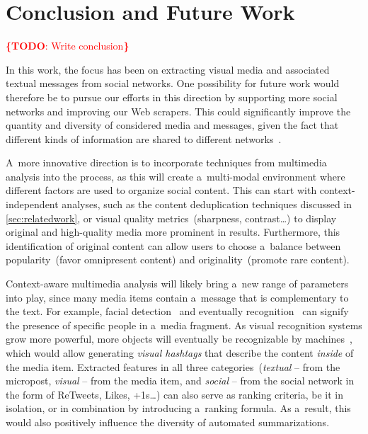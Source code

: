 \documentclass{acm_proc_article-sp}
\let\oldemph\emph
\renewcommand{\emph}[1]{\oldemph{\fontsize{9}{9}\selectfont #1}}
\newcommand{\todo}[1]{\noindent\textcolor{red}{{\bf \{TODO}: #1{\bf \}}}}
\begin{document}

\section{Conclusion and Future Work}
\todo{Write conclusion}

In this work, the focus has been on extracting visual media and associated textual messages from social networks.
One possibility for future work would therefore be to pursue our efforts in this direction by supporting more social networks and improving our Web scrapers.
This could significantly improve the quantity and diversity of considered media and messages,
given the fact that different kinds of information are shared to different networks~\cite{ConsumersLook}.

A~more innovative direction is to incorporate techniques from multimedia analysis into the process,
as this will create a~multi-modal environment where different factors are used to organize social content.
This can start with context-independent analyses, such as the content deduplication techniques discussed in \autoref{sec:relatedwork},
or visual quality metrics~(sharpness, contrast\ldots) to display original and high-quality media more prominent in results.
Furthermore, this identification of original content can allow users to choose a~balance between popularity~(favor omnipresent content) and originality~(promote rare content).

Context-aware multimedia analysis will likely bring a~new range of parameters into play,
since many media items contain a~message that is complementary to the text.
For example, facial detection~\cite{ViolaJones} and eventually recognition~\cite{Wright}
can signify the presence of specific people in a~media fragment.
As visual recognition systems grow more powerful, more objects will eventually be recognizable by machines~\cite{Serre},
which would allow generating \emph{visual hashtags} that describe the content \emph{inside} of the media item.
Extracted features in all three categories~(\emph{textual} -- from the micropost,
\emph{visual} -- from the media item,
and \emph{social} -- from the social network in the form of ReTweets, Likes, +1s\ldots)
can also
serve as ranking criteria, be it in isolation, or in combination by
introducing a~ranking formula.
As a~result, this would also positively influence the diversity of automated summarizations.
\end{document}
